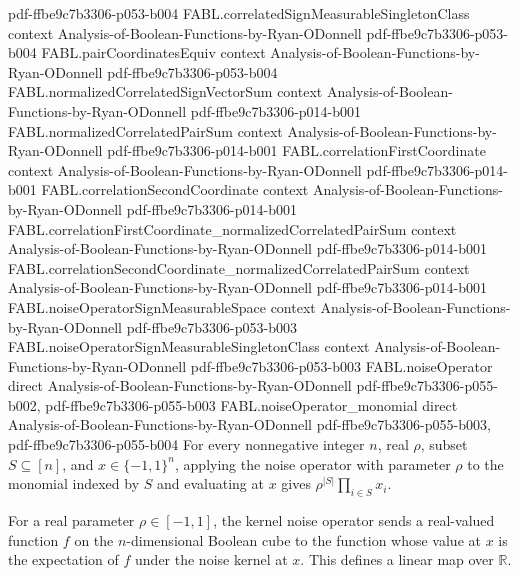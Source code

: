 \begin{theorem}
  {pdf-ffbe9c7b3306-p053-b004}
\proofstep
  {FABL.correlatedSignMeasurableSingletonClass}
  {context}
  {Analysis-of-Boolean-Functions-by-Ryan-ODonnell}
  {pdf-ffbe9c7b3306-p053-b004}
\proofstep
  {FABL.pairCoordinatesEquiv}
  {context}
  {Analysis-of-Boolean-Functions-by-Ryan-ODonnell}
  {pdf-ffbe9c7b3306-p053-b004}
\proofstep
  {FABL.normalizedCorrelatedSignVectorSum}
  {context}
  {Analysis-of-Boolean-Functions-by-Ryan-ODonnell}
  {pdf-ffbe9c7b3306-p014-b001}
\proofstep
  {FABL.normalizedCorrelatedPairSum}
  {context}
  {Analysis-of-Boolean-Functions-by-Ryan-ODonnell}
  {pdf-ffbe9c7b3306-p014-b001}
\proofstep
  {FABL.correlationFirstCoordinate}
  {context}
  {Analysis-of-Boolean-Functions-by-Ryan-ODonnell}
  {pdf-ffbe9c7b3306-p014-b001}
\proofstep
  {FABL.correlationSecondCoordinate}
  {context}
  {Analysis-of-Boolean-Functions-by-Ryan-ODonnell}
  {pdf-ffbe9c7b3306-p014-b001}
\proofstep
  {FABL.correlationFirstCoordinate_normalizedCorrelatedPairSum}
  {context}
  {Analysis-of-Boolean-Functions-by-Ryan-ODonnell}
  {pdf-ffbe9c7b3306-p014-b001}
\proofstep
  {FABL.correlationSecondCoordinate_normalizedCorrelatedPairSum}
  {context}
  {Analysis-of-Boolean-Functions-by-Ryan-ODonnell}
  {pdf-ffbe9c7b3306-p014-b001}
\proofstep
  {FABL.noiseOperatorSignMeasurableSpace}
  {context}
  {Analysis-of-Boolean-Functions-by-Ryan-ODonnell}
  {pdf-ffbe9c7b3306-p053-b003}
\proofstep
  {FABL.noiseOperatorSignMeasurableSingletonClass}
  {context}
  {Analysis-of-Boolean-Functions-by-Ryan-ODonnell}
  {pdf-ffbe9c7b3306-p053-b003}
\proofstep
  {FABL.noiseOperator}
  {direct}
  {Analysis-of-Boolean-Functions-by-Ryan-ODonnell}
  {pdf-ffbe9c7b3306-p055-b002,
    pdf-ffbe9c7b3306-p055-b003}
\proofstep
  {FABL.noiseOperator_monomial}
  {direct}
  {Analysis-of-Boolean-Functions-by-Ryan-ODonnell}
  {pdf-ffbe9c7b3306-p055-b003,
    pdf-ffbe9c7b3306-p055-b004}
For every nonnegative integer $n$, real $\rho$, subset $S\subseteq[n]$, and
$x\in\{−1,1\}^n$, applying the noise operator with parameter $\rho$ to the monomial
indexed by $S$ and evaluating at $x$ gives $\rho^{|S|}\prod_{i\in S}x_i$.
\end{theorem}

\begin{definition}
\label{FABL.kernelNoiseOperator}
\leanok
{}
For a real parameter $\rho\in[-1,1]$, the kernel noise operator sends a real-valued
function $f$ on the $n$-dimensional Boolean cube to the function whose value at $x$ is
the expectation of $f$ under the noise kernel at $x$. This defines a linear map over
$\mathbb{R}$.
\end{definition}

